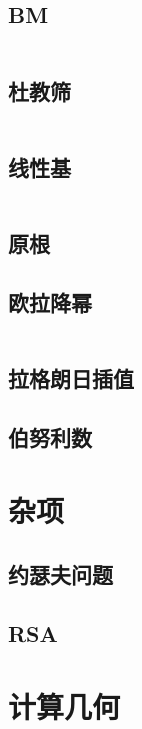 \documentclass[a4paper,11pt]{article}
\begin{document}
\subsection{BM}
\inputminted[breaklines]{c++}{Math/BM.cpp}

\subsection{杜教筛}
\inputminted[breaklines]{c++}{Math/杜教筛.cpp}

\subsection{线性基}
\inputminted[breaklines]{c++}{Math/线性基.cpp}

\subsection{原根}


\subsection{欧拉降幂}
\inputminted[breaklines]{c++}{Math/欧拉降幂.cpp}

\subsection{拉格朗日插值}


\subsection{伯努利数}



\newpage
\section{杂项}

\subsection{约瑟夫问题}


\subsection{RSA}









\newpage
\section{计算几何}







\end{document}
